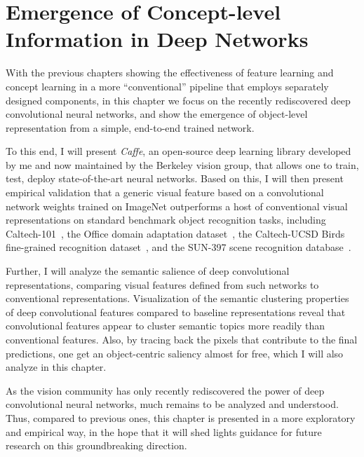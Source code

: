 \chapter{Emergence of Concept-level Information in Deep Networks}

With the previous chapters showing the effectiveness of feature learning and concept learning in a more ``conventional'' pipeline that employs separately designed components, in this chapter we focus on the recently rediscovered deep convolutional neural networks, and show the emergence of object-level representation from a simple, end-to-end trained network.

To this end, I will present \emph{Caffe}, an open-source deep learning library developed by me and now maintained by the Berkeley vision group, that allows one to train, test, deploy state-of-the-art neural networks. Based on this, I will then present empirical validation that a generic visual
feature based on a convolutional network weights trained on ImageNet
outperforms a host of conventional visual representations on standard
benchmark object recognition tasks, including Caltech-101~\cite{caltech101},
the Office domain adaptation dataset~\cite{eccv_saenko},
the Caltech-UCSD Birds fine-grained recognition dataset~\cite{birds},
and the SUN-397 scene recognition database~\cite{xiao10}.


Further, I will analyze the semantic salience of deep convolutional
representations, comparing visual features defined from such networks
to conventional representations. Visualization of the
semantic clustering properties of deep convolutional features compared
to baseline representations reveal that convolutional features
appear to cluster semantic topics more readily than conventional
features. Also, by tracing back the pixels that contribute to the final predictions, one get an object-centric saliency almost for free, which I will also analyze in this chapter.

As the vision community has only recently rediscovered the power of deep convolutional neural networks, much remains to be analyzed and understood. Thus, compared to previous ones, this chapter is presented in a more exploratory and empirical way, in the hope that it will shed lights guidance for future research on this groundbreaking direction.

